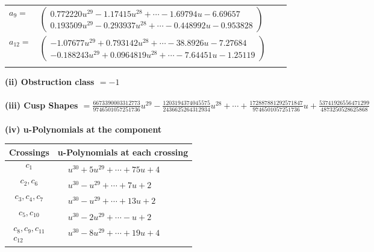 \documentclass[1p]{elsarticle_modified}
\theoremstyle{definition}
\begin{document}
\begin{tabular}{m{7pt} m{180pt} m{7pt} m{180pt} }
\flushright $a_{9}=$&$\begin{pmatrix}0.772220 u^{29}-1.17415 u^{28}+\cdots-1.69794 u-6.69657\\0.193509 u^{29}-0.293937 u^{28}+\cdots-0.448992 u-0.953828\end{pmatrix}$ \\
\flushright $a_{12}=$&$\begin{pmatrix}-1.07677 u^{29}+0.793142 u^{28}+\cdots-38.8926 u-7.27684\\-0.188243 u^{29}+0.0964819 u^{28}+\cdots-7.64451 u-1.25119\end{pmatrix}$\\&\end{tabular}
\flushleft \textbf{(ii) Obstruction class $= -1$}\\~\\
\flushleft \textbf{(iii) Cusp Shapes $= \frac{6673390003312773}{9746501057251736} u^{29}-\frac{1203194374045575}{2436625264312934} u^{28}+\cdots+\frac{172887881292571847}{9746501057251736} u+\frac{53741926556471299}{4873250528625868}$}\\~\\
\newpage\renewcommand{\arraystretch}{1}
\flushleft \textbf{(iv) u-Polynomials at the component}\newline \\
\begin{tabular}{m{50pt}|m{274pt}}
Crossings & \hspace{64pt}u-Polynomials at each crossing \\
\hline $$\begin{aligned}c_{1}\end{aligned}$$&$\begin{aligned}
&u^{30}+5 u^{29}+\cdots+75 u+4
\end{aligned}$\\
\hline $$\begin{aligned}c_{2},c_{6}\end{aligned}$$&$\begin{aligned}
&u^{30}- u^{29}+\cdots+7 u+2
\end{aligned}$\\
\hline $$\begin{aligned}c_{3},c_{4},c_{7}\end{aligned}$$&$\begin{aligned}
&u^{30}- u^{29}+\cdots+13 u+2
\end{aligned}$\\
\hline $$\begin{aligned}c_{5},c_{10}\end{aligned}$$&$\begin{aligned}
&u^{30}-2 u^{29}+\cdots- u+2
\end{aligned}$\\
\hline $$\begin{aligned}c_{8},c_{9},c_{11}\\c_{12}\end{aligned}$$&$\begin{aligned}
&u^{30}-8 u^{29}+\cdots+19 u+4
\end{aligned}$\\
\hline
\end{tabular}\\~\\
\end{document}
